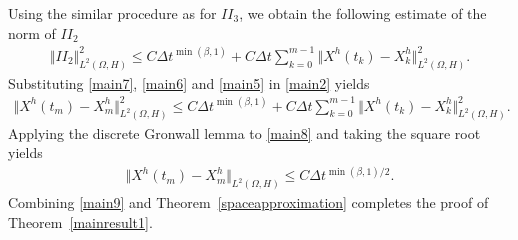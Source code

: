 \documentclass[review,12pt]{elsarticle}
\newcommand{\thmref}[1]{{Theorem~\ref{#1}}}
\begin{document}
Using the similar procedure as  for $II_3$, we obtain the following estimate of the norm of $II_2$
\begin{eqnarray}
\label{main7}
\Vert II_2\Vert^2_{L^2(\Omega, H)}\leq C\Delta t^{\min(\beta, 1)}+C\Delta t\sum_{k=0}^{m-1}\Vert X^h(t_k)-X^h_k\Vert^2_{L^2(\Omega, H)}.
\end{eqnarray}
Substituting \eqref{main7}, \eqref{main6} and \eqref{main5} in \eqref{main2} yields
\begin{eqnarray}
\label{main8}
\Vert X^h(t_m)-X^h_m\Vert^2_{L^2(\Omega, H)}\leq C\Delta t^{\min(\beta, 1)}+C\Delta t\sum_{k=0}^{m-1}\Vert X^h(t_k)-X^h_k\Vert^2_{L^2(\Omega, H)}.
\end{eqnarray}
Applying the discrete Gronwall lemma to \eqref{main8} and taking the square root yields
\begin{eqnarray}
\label{main9}
\Vert X^h(t_m)-X^h_m\Vert_{L^2(\Omega, H)}\leq C\Delta t^{\min(\beta, 1)/2}.
\end{eqnarray}
Combining \eqref{main9} and \thmref{spaceapproximation} completes the proof of \thmref{mainresult1}.
\end{document}
